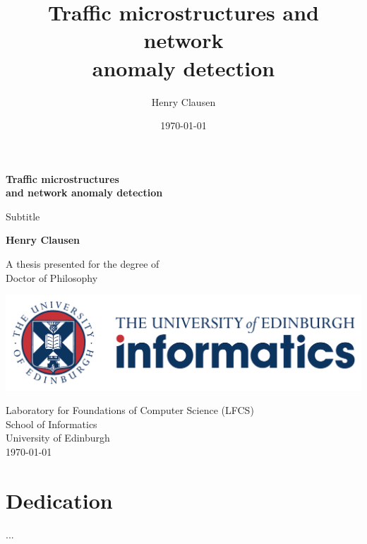 \documentclass[phd,ilcc,twoside]{infthesis}
\title{
{Traffic microstructures and network\\ anomaly detection}\\
}
\author{Henry Clausen}
\date{\today}
\begin{document}
\begin{titlepage}
   \begin{center}
       \vspace*{0.6cm}
 		\Huge
       \textbf{Traffic microstructures\\ and network anomaly detection}
       
		\LARGE
       \vspace{0.3cm}
        Subtitle
            
       \vspace{0.4cm}

       \textbf{Henry Clausen}

\BgThispage
       \vfill
            
\large       A thesis presented for the degree of\\
       Doctor of Philosophy
            
       \vspace{0.5cm}
     


\includegraphics[scale=0.4]{roundel_informatics.jpg}
            
\large Laboratory for Foundations of Computer Science (LFCS)\\            
\large School of Informatics\\
University of Edinburgh\\
\today
            
   \end{center}
\end{titlepage}

%



\chapter*{Dedication}
...
\end{document}
